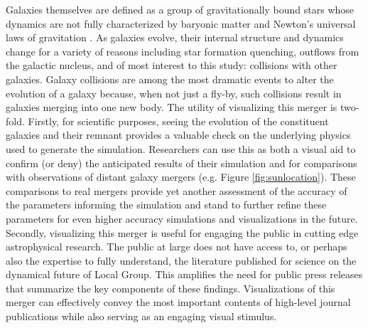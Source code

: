 \documentclass{aastex63}
\begin{document}
Galaxies themselves are defined as a group of gravitationally bound stars whose dynamics are not fully characterized by baryonic matter and Newton's universal laws of gravitation \citep{2012AJ....144...76W}. As galaxies evolve, their internal structure and dynamics change for a variety of reasons including star formation quenching, outflows from the galactic nucleus, and of most interest to this study: collisions with other galaxies. Galaxy collisions are among the most dramatic events to alter the evolution of a galaxy because, when not just a fly-by, such collisions result in galaxies merging into one new body. The utility of visualizing this merger is two-fold. Firstly, for scientific purposes, seeing the evolution of the constituent galaxies and their remnant provides a valuable check on the underlying physics used to generate the simulation. Researchers can use this as both a visual aid to confirm (or deny) the anticipated results of their simulation and for comparisons with observations of distant galaxy mergers (e.g. Figure \ref{fig:sunlocation}). These comparisons to real mergers provide yet another assessment of the accuracy of the parameters informing the simulation and stand to further refine these parameters for even higher accuracy simulations and visualizations in the future. Secondly, visualizing this merger is useful for engaging the public in cutting edge astrophysical research. The public at large does not have access to, or perhaps also the expertise to fully understand, the literature published for science on the dynamical future of Local Group. This amplifies the need for public press releases that summarize the key components of these findings. Visualizations of this merger can effectively convey the most important contents of high-level journal publications while also serving as an engaging visual stimulus.
\end{document}
